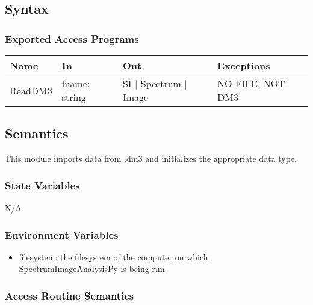 \documentclass[12pt, titlepage]{article}
\newcommand{\progname}{SpectrumImageAnalysisPy}
\begin{document}
\subsection{Syntax}

\subsubsection{Exported Access Programs}

\begin{center}
    \begin{tabular}{p{2cm} p{4cm} p{4cm} p{4cm}}
        \hline
        \textbf{Name} & \textbf{In} & \textbf{Out} & \textbf{Exceptions} \\
        \hline
        ReadDM3 & fname: string & SI $|$ Spectrum $|$ Image & NO FILE, NOT DM3 \\
        \hline
    \end{tabular}
\end{center}

\subsection{Semantics}
This module imports data from .dm3 and initializes the appropriate data type.

\subsubsection{State Variables}
N/A

\subsubsection{Environment Variables}
\begin{itemize}
    \item filesystem: the filesystem of the computer on which \progname{} is being
    run
\end{itemize}
\subsubsection{Access Routine Semantics}
\end{document}
